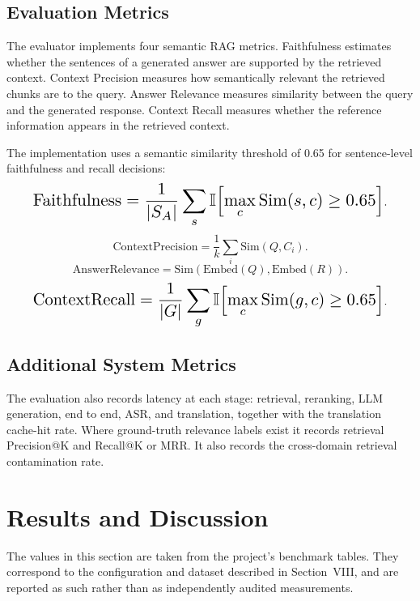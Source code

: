 \documentclass[10pt,twocolumn,letterpaper]{article}
\begin{document}
\subsection{Evaluation Metrics}
The evaluator implements four semantic RAG metrics. Faithfulness estimates whether the sentences of a generated answer are supported by the retrieved context. Context Precision measures how semantically relevant the retrieved chunks are to the query. Answer Relevance measures similarity between the query and the generated response. Context Recall measures whether the reference information appears in the retrieved context.

The implementation uses a semantic similarity threshold of 0.65 for sentence-level faithfulness and recall decisions:
\begin{equation}
\resizebox{0.9\columnwidth}{!}{$\displaystyle \mathrm{Faithfulness} = \frac{1}{|S_A|} \sum_s \mathbb{I}\!\left[ \max_c \mathrm{Sim}(s, c) \geq 0.65 \right]$}.
\end{equation}
\begin{equation}
\mathrm{ContextPrecision} = \frac{1}{k} \sum_i \mathrm{Sim}(Q, C_i).
\end{equation}
\begin{equation}
\mathrm{AnswerRelevance} = \mathrm{Sim}(\mathrm{Embed}(Q), \mathrm{Embed}(R)).
\end{equation}
\begin{equation}
\resizebox{0.9\columnwidth}{!}{$\displaystyle \mathrm{ContextRecall} = \frac{1}{|G|} \sum_g \mathbb{I}\!\left[ \max_c \mathrm{Sim}(g, c) \geq 0.65 \right]$}.
\end{equation}

\subsection{Additional System Metrics}
The evaluation also records latency at each stage: retrieval, reranking, LLM generation, end to end, ASR, and translation, together with the translation cache-hit rate. Where ground-truth relevance labels exist it records retrieval Precision@K and Recall@K or MRR. It also records the cross-domain retrieval contamination rate.

\section{Results and Discussion}
The values in this section are taken from the project's benchmark tables. They correspond to the configuration and dataset described in Section~VIII, and are reported as such rather than as independently audited measurements.
\end{document}
